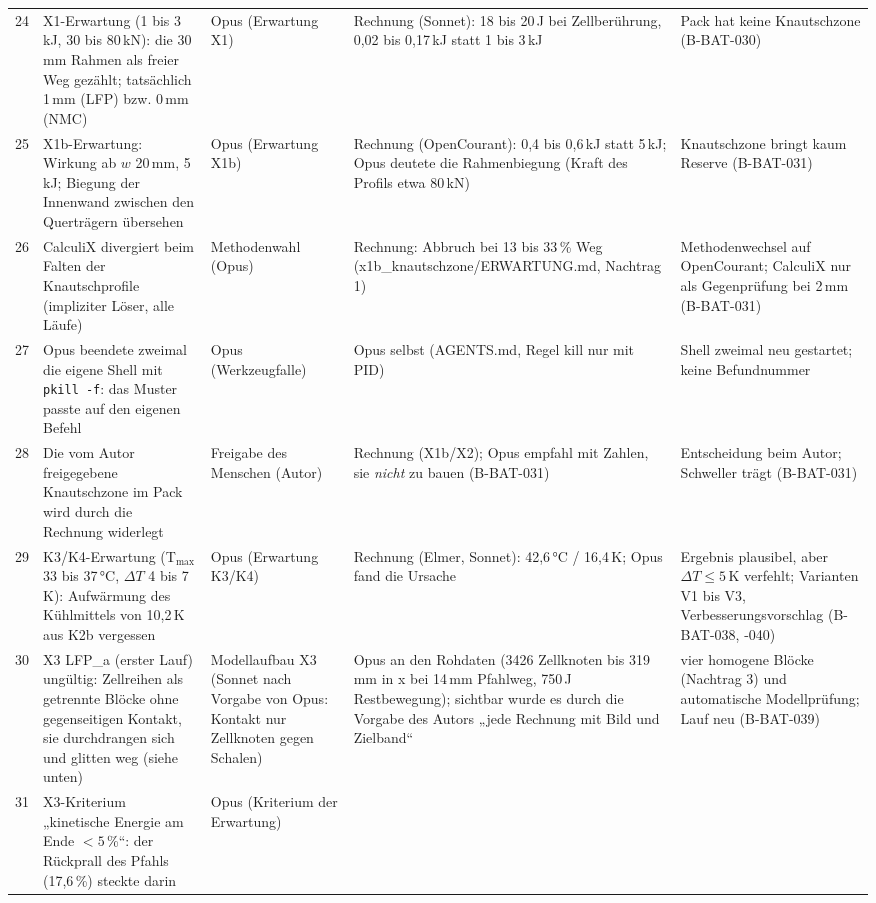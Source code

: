 \documentclass[10pt,a4paper]{article}
\begin{document}
\begin{longtable}{@{}p{0.4cm}p{3.6cm}p{2.5cm}p{4.4cm}p{3.0cm}@{}}
24 & X1-Erwartung (1 bis 3\,kJ, 30 bis 80\,kN): die 30\,mm Rahmen als freier Weg gezählt; tatsächlich 1\,mm (LFP) bzw. 0\,mm (NMC) & Opus (Erwartung X1)
 & Rechnung (Sonnet): 18 bis 20\,J bei Zellberührung, 0,02 bis 0,17\,kJ statt 1 bis 3\,kJ & Pack hat keine Knautschzone (B-BAT-030)\\
25 & X1b-Erwartung: Wirkung ab $w$ 20\,mm, 5\,kJ; Biegung der Innenwand zwischen den Querträgern übersehen & Opus (Erwartung X1b)
 & Rechnung (OpenCourant): 0,4 bis 0,6\,kJ statt 5\,kJ; Opus deutete die Rahmenbiegung (Kraft des Profils etwa 80\,kN) & Knautschzone bringt kaum Reserve (B-BAT-031)\\
26 & CalculiX divergiert beim Falten der Knautschprofile (impliziter Löser, alle Läufe) & Methodenwahl (Opus)
 & Rechnung: Abbruch bei 13 bis 33\,\% Weg (x1b\_knautschzone/ERWARTUNG.md, Nachtrag 1) & Methodenwechsel auf OpenCourant; CalculiX nur als Gegenprüfung bei 2\,mm (B-BAT-031)\\
27 & Opus beendete zweimal die eigene Shell mit \texttt{pkill -f}: das Muster passte auf den eigenen Befehl & Opus (Werkzeugfalle)
 & Opus selbst (AGENTS.md, Regel kill nur mit PID) & Shell zweimal neu gestartet; keine Befundnummer\\
28 & Die vom Autor freigegebene Knautschzone im Pack wird durch die Rechnung widerlegt & Freigabe des Menschen (Autor)
 & Rechnung (X1b/X2); Opus empfahl mit Zahlen, sie \emph{nicht} zu bauen (B-BAT-031) & Entscheidung beim Autor; Schweller trägt (B-BAT-031)\\
29 & K3/K4-Erwartung (T$_{\max}$ 33 bis 37\,°C, $\Delta T$ 4 bis 7\,K): Aufwärmung des Kühlmittels von 10,2\,K aus K2b vergessen & Opus (Erwartung K3/K4)
 & Rechnung (Elmer, Sonnet): 42,6\,°C / 16,4\,K; Opus fand die Ursache & Ergebnis plausibel, aber $\Delta T\le5$\,K verfehlt; Varianten V1 bis V3, Verbesserungsvorschlag (B-BAT-038, -040)\\
30 & X3 LFP\_a (erster Lauf) ungültig: Zellreihen als getrennte Blöcke ohne gegenseitigen Kontakt, sie durchdrangen sich und glitten weg (siehe unten) & Modellaufbau X3 (Sonnet nach Vorgabe von Opus: Kontakt nur Zellknoten gegen Schalen)
 & Opus an den Rohdaten (3426 Zellknoten bis 319\,mm in x bei 14\,mm Pfahlweg, 750\,J Restbewegung); sichtbar wurde es durch die Vorgabe des Autors „jede Rechnung mit Bild und Zielband“ & vier homogene Blöcke (Nachtrag 3) und automatische Modellprüfung; Lauf neu (B-BAT-039)\\
31 & X3-Kriterium „kinetische Energie am Ende $<5$\,\%“: der Rückprall des Pfahls (17,6\,\%) steckte darin & Opus (Kriterium der Erwartung)

\end{longtable}
\end{document}
